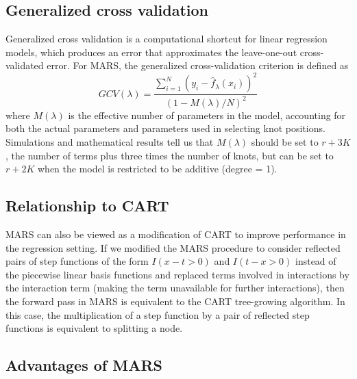 \documentclass[12pt]{article}
\begin{document}

\subsection{Generalized cross validation} %
\label{sub:generalized_cross_validation}

Generalized cross validation is a computational shortcut for linear regression models, which produces an error that approximates the leave-one-out cross-validated error. For MARS, the generalized cross-validation criterion is defined as
\begin{equation}
  GCV(\lambda) = 
    \frac{
      \sum_{i = 1}^{N}(y_{i} - \hat{f}_{\lambda}(x_{i}))^2
    }{
      (1 - M(\lambda)/N)^2
    }
\end{equation}
where $M(\lambda)$ is the effective number of parameters in the model, accounting for both the actual parameters and parameters used in selecting knot positions. Simulations and mathematical results tell us that $M(\lambda)$ should be set to $r + 3K$, the number of terms plus three times the number of knots, but can be set to $r + 2K$ when the model is restricted to be additive (degree = 1).


\subsection{Relationship to CART} %
\label{sub:relationship_to_cart}

MARS can also be viewed as a modification of CART to improve performance in the regression setting. If we modified the MARS procedure to consider reflected pairs of step functions of the form $I(x - t > 0)$ and $I(t - x > 0)$ instead of the piecewise linear basis functions and replaced terms involved in interactions by the interaction term (making the term unavailable for further interactions), then the forward pass in MARS is equivalent to the CART tree-growing algorithm. In this case, the multiplication of a step function by a pair of reflected step functions is equivalent to splitting a node.


\subsection{Advantages of MARS} %
\label{sub:advantages_of_mars}
\end{document}
